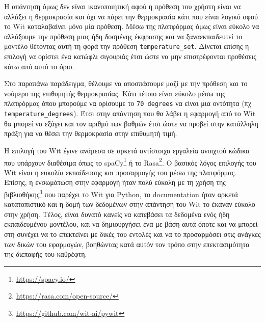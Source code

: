 Η απάντηση όμως δεν είναι ικανοποιητική αφού η πρόθεση του χρήστη είναι να αλλάξει η θερμοκρασία και όχι να πάρει την θερμοκρασία κάτι που είναι λογικό αφού το Wit καταλαβαίνει μόνο μία πρόθεση. Μέσω της πλατφόρμας όμως είναι εύκολο να αλλάξουμε την πρόθεση μιας ήδη δοσμένης έκφρασης και να ξαναεκπαιδευτεί το μοντέλο θέτοντας αυτή τη φορά την πρόθεση \texttt{temperature\_set}. Δίνεται επίσης η επιλογή να ορίστει ένα κατώφλι σιγουριάς έτσι ώστε να μην επιστρέφονται προθέσεις κάτω από αυτό το όριο.

Στο παραπάνω παράδειγμα, θέλουμε να αποσπάσουμε μαζί με την πρόθεση και το νούμερο της επιθυμητής θερμοκρασίας. Κάτι τέτοιο είναι εύκολο μέσω της πλατφόρμας όπου μπορούμε να ορίσουμε το \texttt{70 degrees} να είναι μια οντότητα (πχ \texttt{temperature\_degrees}). Έτσι στην απάντηση που θα λάβει η εφαρμογή από το Wit θα μπορεί να εξάγει και τον αριθμό των βαθμών έτσι ώστε να προβεί στην κατάλληλη πράξη για να θέσει την θερμοκρασία στην επιθυμητή τιμή.

Η επιλογή του Wit έγινε ανάμεσα σε αρκετά αντίστοιχα εργαλεία ανοιχτού κώδικα που υπάρχουν διαθέσιμα όπως το spaCy\footnote{\href{https://spacy.io/}{https://spacy.io/}} ή το Rasa\footnote{\href{https://rasa.com/open-source/}{https://rasa.com/open-source/}}. Ο βασικός λόγος επιλογής του Wit είναι η ευκολία εκπαίδευσης και προσαρμογής του μέσω της πλατφόρμας. Επίσης, η ενσωμάτωση στην εφαρμογή ήταν πολύ εύκολη με τη χρήση της βιβλιοθήκης\footnote{\href{https://github.com/wit-ai/pywit}{https://github.com/wit-ai/pywit}} που παρέχει το Wit για Python, το documentation ήταν αρκετά κατατοπιστικό και η δομή των δεδομένων στην απάντηση του Wit το έκαναν εύκολο στην χρήση. Τέλος, είναι δυνατό κανείς να κατεβάσει τα δεδομένα ενός ήδη εκπαιδευμένου μοντέλου, και να δημιουργήσει ένα με βάση αυτά όποτε και να μπορεί στη συνέχει να το επεκτείνει με δικές του εντολές και να το προσαρμόσει στις ανάγκες των δικών του εφαρμογών, βοηθώντας κατά αυτόν τον τρόπο στην επεκτασιμότητα της διεπαφής του καθρέφτη.